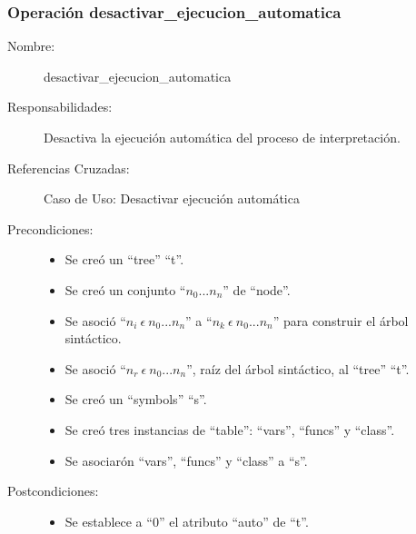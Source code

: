 \subsubsection{Operación desactivar\_ejecucion\_automatica}
\FloatBarrier
\begin{framed}
	\begin{description}
		\item [Nombre:] desactivar\_ejecucion\_automatica
		\item [Responsabilidades:] Desactiva la ejecución automática del proceso de interpretación.
		\item [Referencias Cruzadas: ] Caso de Uso: Desactivar ejecución automática
      \item [Precondiciones:] \hfill
         \begin {itemize}
         \item Se creó un ``tree'' ``t''.
         \item Se creó un conjunto ``$n_0...n_n$'' de ``node''.
         \item Se asoció ``$n_i\ \epsilon\ n_0...n_n$'' a ``$n_k\ \epsilon\ n_0...n_n$'' para construir el árbol sintáctico.
         \item Se asoció  ``$n_r\ \epsilon\ n_0...n_n$'', raíz del árbol sintáctico, al ``tree'' ``t''.
         \item Se creó un ``symbols'' ``s''.
         \item Se creó tres instancias de ``table'': ``vars'', ``funcs'' y ``class''.
         \item Se asociarón ``vars'', ``funcs'' y ``class'' a ``s''.
      \end{itemize}
      \item [Postcondiciones:] \hfill
      \begin {itemize}
         \item Se establece a ``0'' el atributo ``auto'' de ``t''.
      \end{itemize}
	\end{description} 
\end{framed}
\FloatBarrier

